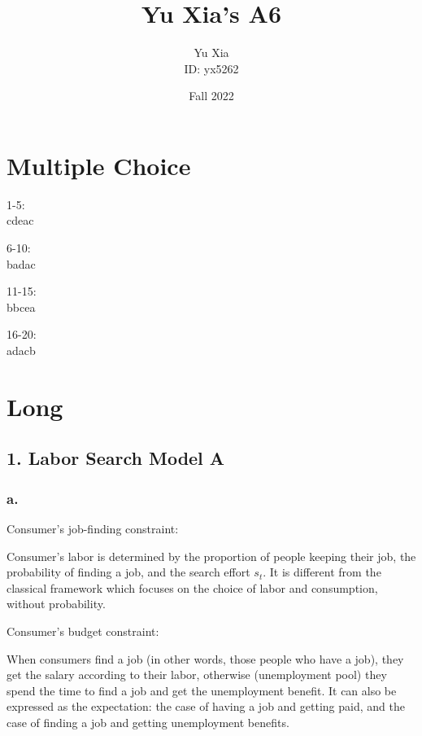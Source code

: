 \documentclass{article}
\author{Yu Xia \\ ID: yx5262}
\title{\textbf{Yu Xia's A6}}
\date{Fall 2022}
\begin{document}
\maketitle

\nocite{*}

\section*{Multiple Choice}

1-5:\\
cdeac

6-10:\\
badac

11-15:\\
bbcea

16-20:\\
adacb

\section*{Long}

\subsection*{1. Labor Search Model A}

\subsubsection*{a.}

Consumer's job-finding constraint:


Consumer's labor is determined by the proportion of people keeping their job, the probability of finding a job, and the search effort $s_{t}$. It is different from the classical framework which focuses on the choice of labor and consumption, without probability.

Consumer's budget constraint:


When consumers find a job (in other words, those people who have a job), they get the salary according to their labor, otherwise (unemployment pool) they spend the time to find a job and get the unemployment benefit. It can also be expressed as the expectation: the case of having a job and getting paid, and the case of finding a job and getting unemployment benefits.
\end{document}
